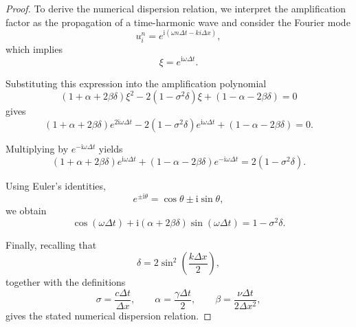\documentclass{Configuration_Files/PoliMi3i_thesis}
\begin{document}
\begin{proof}
To derive the numerical dispersion relation, we interpret the amplification
factor as the propagation of a time-harmonic wave and consider the Fourier mode
\begin{equation*}
u_i^n=e^{\mathrm{i}(\omega n \Delta t - k i \Delta x)},
\end{equation*}
which implies
\begin{equation*}
\xi=e^{\mathrm{i}\omega\Delta t}.
\end{equation*}

Substituting this expression into the amplification polynomial
\begin{equation*}
(1+\alpha+2\beta\delta)\xi^2
-2(1-\sigma^2\delta)\xi
+(1-\alpha-2\beta\delta)=0
\end{equation*}
gives
\begin{equation*}
(1+\alpha+2\beta\delta)e^{2\mathrm{i}\omega\Delta t}
-2(1-\sigma^2\delta)e^{\mathrm{i}\omega\Delta t}
+(1-\alpha-2\beta\delta)=0.
\end{equation*}

Multiplying by $e^{-\mathrm{i}\omega\Delta t}$ yields
\begin{equation*}
(1+\alpha+2\beta\delta)e^{\mathrm{i}\omega\Delta t}
+
(1-\alpha-2\beta\delta)e^{-\mathrm{i}\omega\Delta t}
=
2(1-\sigma^2\delta).
\end{equation*}

Using Euler's identities,
\begin{equation*}
e^{\pm\mathrm{i}\theta}
=
\cos\theta
\pm
\mathrm{i}\sin\theta,
\end{equation*}
we obtain
\begin{equation*}
\cos(\omega\Delta t)
+
\mathrm{i}(\alpha+2\beta\delta)
\sin(\omega\Delta t)
=
1-\sigma^2\delta.
\end{equation*}

Finally, recalling that
\begin{equation*}
\delta
=
2\sin^2\!\left(\frac{k\Delta x}{2}\right),
\end{equation*}
together with the definitions
\begin{equation*}
\sigma=\frac{c\Delta t}{\Delta x},
\qquad
\alpha=\frac{\gamma\Delta t}{2},
\qquad
\beta=\frac{\nu\Delta t}{2\Delta x^2},
\end{equation*}
gives the stated numerical dispersion relation.


\end{proof}
\end{document}
